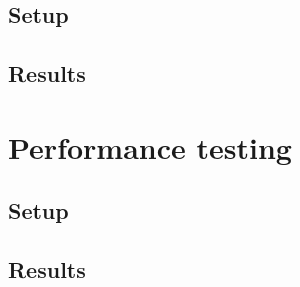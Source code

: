 \subsection{Setup}
\subsection{Results}


\section{Performance testing}
\subsection{Setup}
\subsection{Results}





